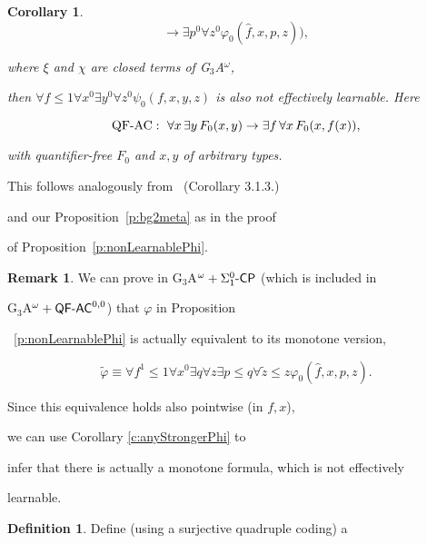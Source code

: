 \documentclass[1p]{elsarticle}
\newcommand{\usftext}[1]{\textsf{\upshape #1}}
\newcommand{\CP}{\ensuremath{\usftext{CP}}}
\newcommand{\QF}{\ensuremath{\usftext{QF}}}
\newcommand{\AC}{\ensuremath{\usftext{AC}}}
\newcommand{\SiLm}{\ensuremath{\Sigma^0_1\usftext{-}}}
\newcommand{\m}{\ensuremath{\usftext{-}}}
\theoremstyle{plain}
\newtheorem{cor}[thm]{Corollary}
\theoremstyle{definition}
\newtheorem{dfn}[thm]{Definition}
\newtheorem{rmk}[thm]{Remark}
\theoremstyle{remark}
\renewenvironment{proof}[1][]{\noindent{\bf Proof{#1}. }}{\nopagebreak[4]{\hspace*{\fill}


  $\Box$              %

 }{\vspace{2ex}}}
\renewcommand{\phi}{\varphi}
\theoremstyle{definition}
\begin{document}
{\begin{cor}
\[ \rightarrow \exists p^0\forall z^0 \phi_0(\widehat{f},x,p,z) \big),

\]

where $\xi$ and $\chi$ are closed terms of {\rm G$_3$A$^\omega$,}

then $\forall f\leq 1\forall x^0\exists y^0\forall z^0 \psi_0(f,x,y,z)$ is also not effectively learnable. Here 

\[ \mbox{\rm QF-AC}: \ \forall x\,\exists y\,F_0(x,y)\rightarrow 

\exists f\,\forall x\,F_0(x,f(x)), \] 

with quantifier-free $F_0$ and $x,y$ of arbitrary types.

\end{cor}

\begin{proof}

This follows analogously from~\cite{Kohlenbach(lowrate)} (Corollary 3.1.3.) 

and our Proposition~\ref{p:bg2meta} as in the proof

of Proposition~\ref{p:nonLearnablePhi}.

\end{proof}



\begin{rmk}

We can prove in {\rm G$_3$A$^\omega+\SiLm\CP$} (which is included in 

{\rm G$_3$A$^\omega+\QF\m\AC^{0,0}$}) that $\phi$ in Proposition

~\ref{p:nonLearnablePhi} is actually equivalent to its monotone version, 

\[

\tilde\phi\equiv \forall f^1\leq 1\forall x^0\exists q\forall z \exists 

p\leq q\forall \tilde z\leq z \phi_0(\widehat{f},x,p,z).

\]

Since this equivalence holds also pointwise (in $f,x$), 

we can use Corollary \ref{c:anyStrongerPhi} to 

infer that there is actually a monotone formula, which is not effectively 

learnable.

\end{rmk}



\begin{dfn}\label{d:gammaf} Define (using a surjective quadruple coding) a 


\end{dfn}}
\end{document}
